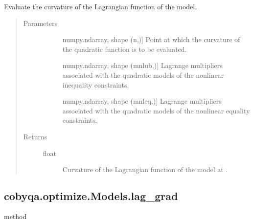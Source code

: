 \documentclass[letterpaper,10pt,english]{sphinxmanual}
\begin{document}
\begin{fulllineitems}
\begin{fulllineitems}
\label{\detokenize{refs/generated/cobyqa.optimize.Models.lag_curv:cobyqa.optimize.Models.lag_curv}}
\sphinxAtStartPar
Evaluate the curvature of the Lagrangian function of the model.
\begin{quote}\begin{description}
\item[{Parameters}] \leavevmode\begin{description}
\item[{}] \leavevmode{[}numpy.ndarray, shape (n,){]}
\sphinxAtStartPar
Point at which the curvature of the quadratic function is to be
evaluated.

\item[{}] \leavevmode{[}numpy.ndarray, shape (mnlub,){]}
\sphinxAtStartPar
Lagrange multipliers associated with the quadratic models of the
nonlinear inequality constraints.

\item[{}] \leavevmode{[}numpy.ndarray, shape (mnleq,){]}
\sphinxAtStartPar
Lagrange multipliers associated with the quadratic models of the
nonlinear equality constraints.

\end{description}

\item[{Returns}] \leavevmode\begin{description}
\item[{float}] \leavevmode
\sphinxAtStartPar
Curvature of the Lagrangian function of the model at .

\end{description}

\end{description}\end{quote}

\end{fulllineitems}



\subsection{cobyqa.optimize.Models.lag\_grad}
\label{\detokenize{refs/generated/cobyqa.optimize.Models.lag_grad:cobyqa-optimize-models-lag-grad}}\label{\detokenize{refs/generated/cobyqa.optimize.Models.lag_grad::doc}}
\sphinxAtStartPar
method


\end{fulllineitems}
\end{document}
